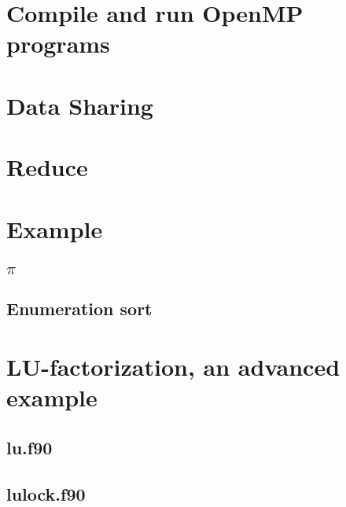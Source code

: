 \chapter{Compile and run OpenMP programs}



\chapter{Data Sharing}



\chapter{Reduce}

\label{reduce}

\chapter{Example}

\section{$\pi$}

\label{pi}

\section{Enumeration sort}

\label{enumsort}

\chapter{LU-factorization, an advanced example}

\lstset{tabsize=3, inputencoding=utf8x, extendedchars=\true, language=Fortran}

\section{lu.f90}


\section{lulock.f90}

